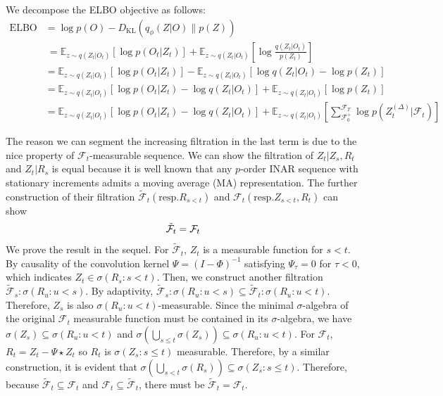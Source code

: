 \documentclass[10pt]{article}
\numberwithin{figure}{section}
\begin{document}
We decompose the ELBO objective as follows:
\begingroup
\setlength{\abovedisplayskip}{6pt}
\setlength{\belowdisplayskip}{6pt}
    \begin{align*}    
    \text{ELBO} &=  \log p(O) - D_{\text{KL}}(q_{\phi}(Z|O)\|p (Z)) \\
    & ~ = \mathbb{E}_{z\sim q(Z_t|O_t)}[\log p(O_t|Z_t)] +  \mathbb{E}_{z\sim q(Z_t|O_t)}\left[\log \frac{q(Z_t|O_t)}{p(Z_t)}\right] \\
    &= \mathbb{E}_{z\sim q(Z_t|O_t)}[\log p(O_t|Z_t)] - \mathbb{E}_{z\sim q(Z_t|O_t)}\left[\log q(Z_t|O_t) - \log p(Z_t) \right] \\
    &= \mathbb{E}_{z\sim q(Z_t|O_t)}\left[\log p(O_t|Z_t)-\log q(Z_t|O_t) \right] + \mathbb{E}_{z\sim q(Z_t|O_t)}\left[ \log p(Z_t) \right] \\
    &= \mathbb{E}_{z\sim q(Z_t|O_t)}\left[\log p(O_t|Z_t) - \log q(Z_t|O_t) \right] + \mathbb{E}_{z\sim q(Z_t|O_t)}\left[ \sum\limits_{\mathcal{F}_0^+}^{\mathcal{F}_T} \log p (Z_t^{(\Delta)}|\mathcal{F}_t) \right]
    \end{align*}

\endgroup
The reason we can segment the increasing filtration in the last term is due to the nice property of $\mathcal{F}_t$-measurable sequence.  We can show the filtration of $Z_t|Z_s,R_t$ and $Z_t|R_s$ is equal because it is well known that any $p$-order INAR sequence with stationary increments admits a moving average (MA) representation.  The further construction of their filtration $\mathcal{\tilde F}_t(\mathrm{resp.} R_{s<t})$ and  $\mathcal{F}_t(\mathrm{resp.} Z_{s<t},R_t)$ can show
\begingroup
\setlength{\abovedisplayskip}{4pt}
\setlength{\belowdisplayskip}{4pt}
\begin{align}
\mathcal{\tilde F}_t = \mathcal{ F}_t \notag
\end{align}
\endgroup
We prove the result in the sequel.  For $\mathcal{\tilde F}_t$, $Z_t$ is a measurable function for $s<t$. By causality of the convolution kernel $\Psi=(I-\Phi)^{-1}$ satisfying $\Psi_{\tau}=0$ for $\tau <0$, which indicates $Z_t \in \sigma(R_s:s<t)$. Then, we construct another filtration $\mathcal{\tilde F}_s:\sigma(R_u:u<s)$. By adaptivity, $\mathcal{\tilde F}_s:\sigma(R_u:u<s)\subseteq \mathcal{\tilde F}_t:\sigma(R_u:u<t) $. Therefore, $Z_s$ is also $\sigma(R_u:u<t)$-measurable. Since the minimal $\sigma$-algebra of the original $\mathcal{F}_t$ measurable function must be contained in its $\sigma$-algebra, we have $\sigma(Z_s)\subseteq \sigma (R_u:u<t)$ and $\sigma(\bigcup\limits_{s\le t}^{} \sigma(Z_s))\subseteq \sigma (R_u:u<t)$. For $\mathcal{F}_t$, $R_t=Z_t - \Psi\star Z_t$ so $R_t$ is $\sigma(Z_s:s\le t)$ measurable. Therefore, by a similar construction, it is evident that $\sigma(\bigcup\limits_{s<t}^{}\sigma( R_s))\subseteq \sigma(Z_s:s\le t)$. Therefore, because $\mathcal{\tilde F}_t \subseteq \mathcal{ F}_t$ and $\mathcal{F}_t \subseteq\mathcal{\tilde F}_t$, there must be $\mathcal{\tilde F}_t = \mathcal{ F}_t$. 
\end{document}
